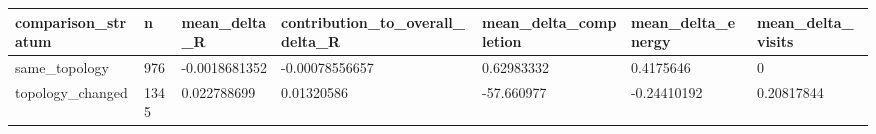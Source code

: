 \begin{tabular}{lllllll}
\hline
comparison\_stratum & n & mean\_delta\_R & contribution\_to\_overall\_delta\_R & mean\_delta\_completion & mean\_delta\_energy & mean\_delta\_visits \\
\hline
same\_topology & 976 & -0.0018681352 & -0.00078556657 & 0.62983332 & 0.4175646 & 0 \\
topology\_changed & 1345 & 0.022788699 & 0.01320586 & -57.660977 & -0.24410192 & 0.20817844 \\
\hline
\end{tabular}

